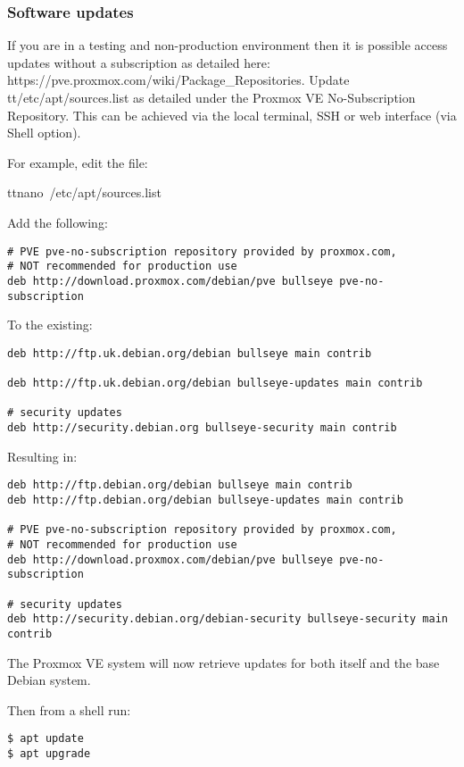 \hypertarget{software-updates}{%
\subsubsection{Software updates}\label{software-updates}}

If you are in a testing and non-production environment then it is
possible access updates without a subscription as detailed here:
https://pve.proxmox.com/wiki/Package\_Repositories. Update
tt{/etc/apt/sources.list} as detailed under the Proxmox VE
No-Subscription Repository. This can be achieved via the local terminal,
SSH or web interface (via Shell option).

For example, edit the file:

tt{nano\ /etc/apt/sources.list}

Add the following:

\begin{verbatim}
# PVE pve-no-subscription repository provided by proxmox.com,
# NOT recommended for production use
deb http://download.proxmox.com/debian/pve bullseye pve-no-subscription
\end{verbatim}

To the existing:

\begin{verbatim}
deb http://ftp.uk.debian.org/debian bullseye main contrib

deb http://ftp.uk.debian.org/debian bullseye-updates main contrib

# security updates
deb http://security.debian.org bullseye-security main contrib
\end{verbatim}

Resulting in:

\begin{verbatim}
deb http://ftp.debian.org/debian bullseye main contrib
deb http://ftp.debian.org/debian bullseye-updates main contrib

# PVE pve-no-subscription repository provided by proxmox.com,
# NOT recommended for production use
deb http://download.proxmox.com/debian/pve bullseye pve-no-subscription

# security updates
deb http://security.debian.org/debian-security bullseye-security main contrib
\end{verbatim}

The Proxmox VE system will now retrieve updates for both itself and the
base Debian system.

Then from a shell run:

\begin{verbatim}
$ apt update
$ apt upgrade
\end{verbatim}

